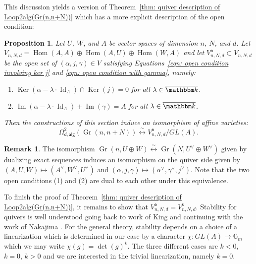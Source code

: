 \documentclass{amsart}
\newtheorem{proposition}[theorem]{Proposition}
\theoremstyle{definition}
\newtheorem{remark}[theorem]{Remark}
\newcommand{\kk} {{\mathbbm k}}
\newcommand{\Hom}{\operatorname{Hom}}
\newcommand{\Ker}{\operatorname{Ker}}
\newcommand{\im}{\operatorname{Im}}
\newcommand{\alg}{\mathsf{alg}}
\newcommand{\open}{\mathsf{o}}
\newcommand{\stable}{\mathsf{s}}
\newcommand{\Gr}{\operatorname{Gr}}
\newcommand{\LoopTwo}{\Omega^{2}_{d,\alg}}
\newcommand{\Id}{\operatorname{Id}}
\begin{document}
This discussion yields a version of Theorem~\ref{thm: quiver description
of Loop2alg(Gr(n,n+N))} which has a more explicit description of the open
condition:

\begin{proposition}\label{prop: quiver description of Loop2(Gr(n,n+N))
with explicit stability condition}
Let $U$, $W$, and $A$ be vector spaces of dimension $n$, $N$, and
$d$. Let $V_{n,N,d} = \Hom (A,A)\oplus \Hom (A,U)\oplus \Hom (W,A)$ and let
$V^{\open}_{n,N,d}\subset V_{n,N,d}$ be the open set of $(\alpha ,j,\gamma )\in V$
satisfying Equations~\eqref{eqn: open condition involving ker j} and
\eqref{eqn: open condition with gamma}, namely:
\begin{enumerate}
\item $\Ker (\alpha -\lambda \cdot \Id_{A})\cap \Ker (j) = 0$ for all
$\lambda\in \overline{\kk} $.
\item  $\im (\alpha -\lambda \cdot \Id_{A})+  \im (\gamma )=A$ for
all $\lambda\in \overline{\kk} $.
\end{enumerate}
Then the constructions of this section induce an isomorphism of affine
varieties:
\[
\LoopTwo (\Gr (n,n+N))\overset \sim \longleftrightarrow V^{\open}_{n,N,d}/GL(A) .
\]
\end{proposition}


\begin{remark}\label{rem: duality induced by Gr(n,n+N)=Gr(N,n+N)}
The isomorphism $\Gr (n,U\oplus W)\overset \sim \longleftrightarrow \Gr (N,U^{\vee}\oplus
W^{\vee})$ given by dualizing exact sequences induces an isomorphism
on the quiver side given by $(A,U,W)\mapsto
(A^{\vee},W^{\vee},U^{\vee})$ and $(\alpha ,j,\gamma )\mapsto
(\alpha^{\vee},\gamma^{\vee},j^{\vee})$. Note that the two open
conditions (1) and (2) are dual to each other under this equivalence. 
\end{remark}


To finish the proof of Theorem~\ref{thm: quiver description of
Loop2alg(Gr(n,n+N))}, it remains to show that $V^{\open}_{n,N,d} =
V^{\stable}_{n,N,d}$. Stability for quivers is well understood going
back to work of King \cite{King-quivers} and continuing with the work
of Nakajima \cite{Nakajima-Duke88,Nakajima-Handsaw}. For the general
theory, stability depends on a choice of a linearization which is
determined in our case by a character $\chi : GL(A)\to \mathbb{G}_{m}$ which
we may write $\chi (g) = \operatorname{det}(g)^{k}$. The three
different cases are $k<0$, $k=0$, $k>0$ and we are interested in the
trivial linearization, namely $k=0$.
\end{document}
